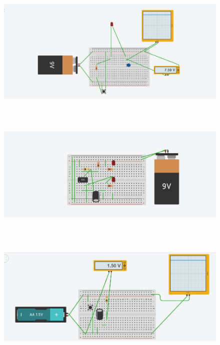 \documentclass[12pt,a4paper]{article}
\begin{document}
\begin{figure}
	\begin{center}
		\includegraphics[width=12cm, height=6cm]{g6.png}
			\end{center}
				\end{figure}
\newpage
\begin{figure}
	\begin{center}
		\includegraphics[width=12cm, height=6cm]{g7.png}
			\end{center}
				\end{figure}
\begin{figure}
	\begin{center}
		\includegraphics[width=12cm, height=6cm]{g8.png}
			\end{center}
				\end{figure}
\end{document}
